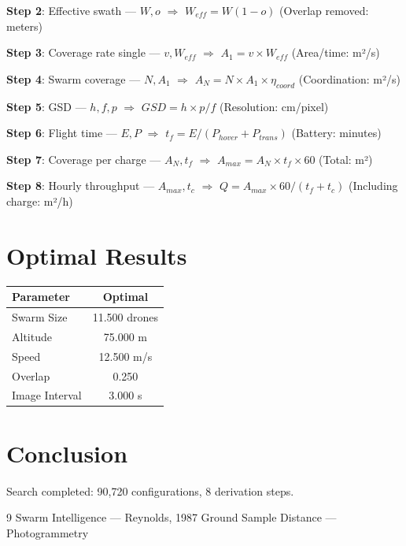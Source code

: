 \documentclass[11pt,twocolumn]{article}
\begin{document}
\textbf{Step 2}: Effective swath --- $W, o$ $\Rightarrow$ $W_{eff} = W(1-o)$ (Overlap removed: meters)


\textbf{Step 3}: Coverage rate single --- $v, W_{eff}$ $\Rightarrow$ $A_1 = v \times W_{eff}$ (Area/time: m²/s)


\textbf{Step 4}: Swarm coverage --- $N, A_1$ $\Rightarrow$ $A_N = N \times A_1 \times \eta_{coord}$ (Coordination: m²/s)


\textbf{Step 5}: GSD --- $h, f, p$ $\Rightarrow$ $GSD = h \times p / f$ (Resolution: cm/pixel)


\textbf{Step 6}: Flight time --- $E, P$ $\Rightarrow$ $t_f = E/(P_{hover} + P_{trans})$ (Battery: minutes)


\textbf{Step 7}: Coverage per charge --- $A_N, t_f$ $\Rightarrow$ $A_{max} = A_N \times t_f \times 60$ (Total: m²)


\textbf{Step 8}: Hourly throughput --- $A_{max}, t_c$ $\Rightarrow$ $Q = A_{max} \times 60/(t_f + t_c)$ (Including charge: m²/h)


\section{Optimal Results}
\begin{table}[h]
\centering
\begin{tabular}{@{}lc@{}}
\toprule
Parameter & Optimal \\
\midrule
Swarm Size & 11.500 drones \\
Altitude & 75.000 m \\
Speed & 12.500 m/s \\
Overlap & 0.250  \\
Image Interval & 3.000 s \\
\bottomrule
\end{tabular}
\end{table}

\section{Conclusion}
Search completed: 90,720 configurations, 8 derivation steps.

\begin{thebibliography}{9}
 Swarm Intelligence --- Reynolds, 1987
 Ground Sample Distance --- Photogrammetry
\end{thebibliography}
\end{document}
